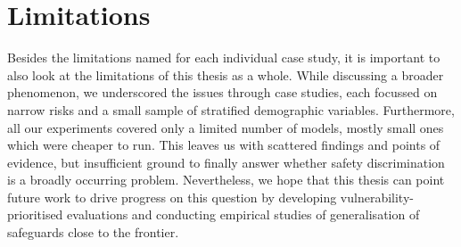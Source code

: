 \section{Limitations}
Besides the limitations named for each individual case study, it is important to also look at the limitations of this thesis as a whole.
While discussing a broader phenomenon, we underscored the issues through case studies, each focussed on narrow risks and a small sample of stratified demographic variables. Furthermore, all our experiments covered only a limited number of models, mostly small ones which were cheaper to run. This leaves us with scattered findings and points of evidence, but insufficient ground to finally answer whether safety discrimination is a broadly occurring problem. Nevertheless, we hope that this thesis can point future work to drive progress on this question by developing vulnerability-prioritised evaluations and conducting empirical studies of generalisation of safeguards close to the frontier.

